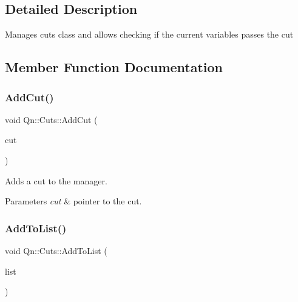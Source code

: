 \subsection{Detailed Description}
Manages cuts class and allows checking if the current variables passes the cut 

\subsection{Member Function Documentation}
\mbox{\label{classQn_1_1Cuts_aae5bfa081e4d3eec94422b3a8ae4213b}} 
\subsubsection{\texorpdfstring{Add\+Cut()}{AddCut()}}
{\footnotesize\ttfamily void Qn\+::\+Cuts\+::\+Add\+Cut (\begin{DoxyParamCaption}\item[{std\+::unique\+\_\+ptr$<$ \mbox{\hyperlink{structQn_1_1VariableCutBase}{Variable\+Cut\+Base}} $>$}]{cut }\end{DoxyParamCaption})\hspace{0.3cm}{\ttfamily [inline]}}



Adds a cut to the manager. 


\begin{DoxyParams}{Parameters}
{\em cut} & pointer to the cut. \\
\hline
\end{DoxyParams}
\mbox{\label{classQn_1_1Cuts_ade6fa16364755bd88ed127ea8ef4cdb4}} 
\subsubsection{\texorpdfstring{Add\+To\+List()}{AddToList()}}
{\footnotesize\ttfamily void Qn\+::\+Cuts\+::\+Add\+To\+List (\begin{DoxyParamCaption}\item[{T\+List $\ast$}]{list }\end{DoxyParamCaption})\hspace{0.3cm}{\ttfamily [inline]}}



